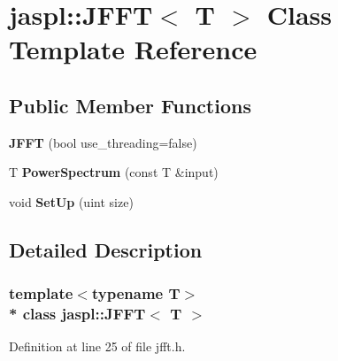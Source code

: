 \hypertarget{classjaspl_1_1_j_f_f_t}{}\section{jaspl\+:\+:J\+F\+FT$<$ T $>$ Class Template Reference}
\label{classjaspl_1_1_j_f_f_t}
\subsection*{Public Member Functions}
\begin{DoxyCompactItemize}
\item 
{\bfseries J\+F\+FT} (bool use\+\_\+threading=false)\hypertarget{classjaspl_1_1_j_f_f_t_ab5007d5c781451c67f12dc20f16aac1c}{}\label{classjaspl_1_1_j_f_f_t_ab5007d5c781451c67f12dc20f16aac1c}

\item 
T {\bfseries Power\+Spectrum} (const T \&input)\hypertarget{classjaspl_1_1_j_f_f_t_a690e9462cf805a922e4e8d7ff043a20c}{}\label{classjaspl_1_1_j_f_f_t_a690e9462cf805a922e4e8d7ff043a20c}

\item 
void {\bfseries Set\+Up} (uint size)\hypertarget{classjaspl_1_1_j_f_f_t_a470cfd21040a322f040a22a436372b9e}{}\label{classjaspl_1_1_j_f_f_t_a470cfd21040a322f040a22a436372b9e}

\end{DoxyCompactItemize}


\subsection{Detailed Description}
\subsubsection*{template$<$typename T$>$\\*
class jaspl\+::\+J\+F\+F\+T$<$ T $>$}



Definition at line 25 of file jfft.\+h.

